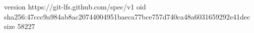 version https://git-lfs.github.com/spec/v1
oid sha256:47ccc9a984ab8ac20744004951baeca77bce757d740ca48a6031659292e41dec
size 58227

